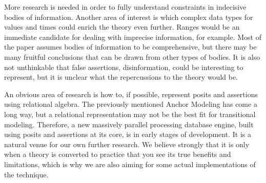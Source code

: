 \documentclass[sfsidenotes,nobib,twoside,symmetric]{tufte-handout}
\begin{document}
More research is needed in order to fully understand constraints in indecisive bodies of information. Another area of interest is which complex data types for values and times could enrich the theory even further. Ranges would be an immediate candidate for dealing with imprecise information, for example. Most of the paper assumes bodies of information to be comprehensive, but there may be many fruitful conclusions that can be drawn from other types of bodies. It is also not unthinkable that false assertions, disinformation, could be interesting to represent, but it is unclear what the repercussions to the theory would be. 

An obvious area of research is how to, if possible, represent posits and assertions using relational algebra. The previously mentioned Anchor Modeling has come a long way, but a relational representation may not be the best fit for transitional modeling. Therefore, a new massively parallel processing database engine, built using posits and assertions at its core, is in early stages of development. It is a natural venue for our own further research. We believe strongly that it is only when a theory is converted to practice that you see its true benefits and limitations, which is why we are also aiming for some actual implementations of the technique. 

\end{document}
